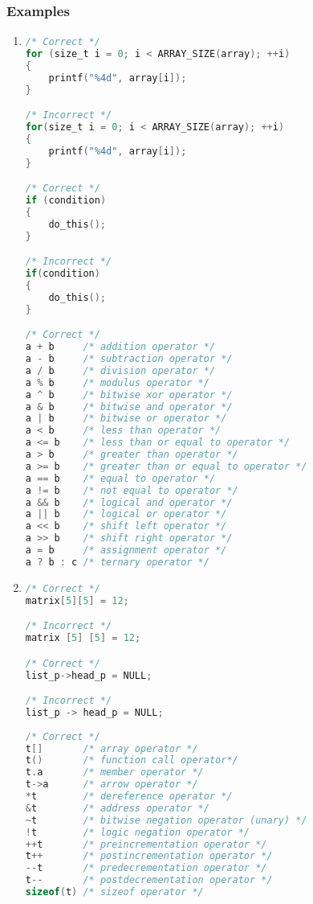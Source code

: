 \subsubsection{Examples}
\begin{enumerate}
    \item 
\begin{lstlisting}[language=C,style=C99]
/* Correct */
for (size_t i = 0; i < ARRAY_SIZE(array); ++i)
{
    printf("%4d", array[i]);
}

/* Incorrect */
for(size_t i = 0; i < ARRAY_SIZE(array); ++i)
{
    printf("%4d", array[i]);
}

/* Correct */
if (condition)
{
    do_this();
}

/* Incorrect */
if(condition)
{
    do_this();
}

/* Correct */
a + b     /* addition operator */
a - b     /* subtraction operator */
a / b     /* division operator */
a % b     /* modulus operator */
a ^ b     /* bitwise xor operator */
a & b     /* bitwise and operator */
a | b     /* bitwise or operator */
a < b     /* less than operator */
a <= b    /* less than or equal to operator */
a > b     /* greater than operator */
a >= b    /* greater than or equal to operator */
a == b    /* equal to operator */
a != b    /* not equal to operator */
a && b    /* logical and operator */
a || b    /* logical or operator */
a << b    /* shift left operator */
a >> b    /* shift right operator */
a = b     /* assignment operator */
a ? b : c /* ternary operator */
\end{lstlisting}  

    \item 
\begin{lstlisting}[language=C,style=C99]
/* Correct */
matrix[5][5] = 12;

/* Incorrect */
matrix [5] [5] = 12; 

/* Correct */
list_p->head_p = NULL;

/* Incorrect */
list_p -> head_p = NULL;
    
/* Correct */
t[]       /* array operator */
t()       /* function call operator*/
t.a       /* member operator */
t->a      /* arrow operator */
*t        /* dereference operator */
&t        /* address operator */
~t        /* bitwise negation operator (unary) */
!t        /* logic negation operator */
++t       /* preincrementation operator */
t++       /* postincrementation operator */
--t       /* predecrementation operator */
t--       /* postdecrementation operator */
sizeof(t) /* sizeof operator */
\end{lstlisting} 
    

\end{enumerate}
